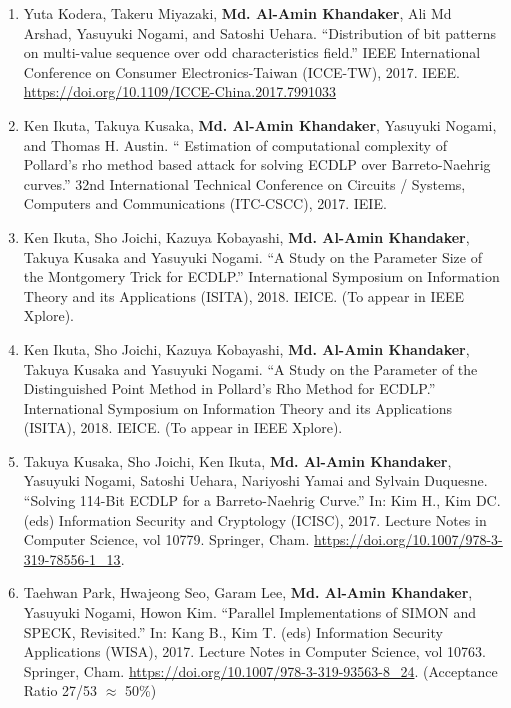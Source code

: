 \begin{itemize}
\begin{enumerate}
	\item Yuta Kodera, Takeru Miyazaki, \textbf{Md. Al-Amin Khandaker}, Ali Md Arshad, Yasuyuki Nogami, and Satoshi Uehara. ``Distribution of bit patterns on multi-value sequence over odd characteristics field.'' IEEE International Conference on Consumer Electronics-Taiwan (ICCE-TW), 2017. IEEE.  \url{https://doi.org/10.1109/ICCE-China.2017.7991033} 
	
	\item Ken Ikuta, Takuya Kusaka, \textbf{Md. Al-Amin Khandaker}, Yasuyuki Nogami, and Thomas H. Austin. `` Estimation of computational complexity of Pollard's rho method based attack for solving ECDLP over Barreto-Naehrig curves.'' 32nd International Technical Conference on Circuits / Systems, Computers and Communications (ITC-CSCC), 2017. IEIE. 
	
	\item Ken Ikuta, Sho Joichi, Kazuya Kobayashi, \textbf{Md. Al-Amin Khandaker}, Takuya Kusaka and Yasuyuki Nogami. ``A Study on the Parameter Size of the Montgomery Trick for ECDLP.'' International Symposium on Information Theory and its Applications (ISITA), 2018. IEICE. (To appear in IEEE Xplore).
	
	\item Ken Ikuta, Sho Joichi, Kazuya Kobayashi, \textbf{Md. Al-Amin Khandaker}, Takuya Kusaka and Yasuyuki Nogami. ``A Study on the Parameter of the Distinguished Point Method in Pollard's Rho Method for ECDLP.'' International Symposium on Information Theory and its Applications (ISITA), 2018. IEICE. (To appear in IEEE Xplore).
	
	\item Takuya Kusaka, Sho Joichi, Ken Ikuta, \textbf{Md. Al-Amin Khandaker}, Yasuyuki Nogami, Satoshi Uehara, Nariyoshi Yamai and Sylvain Duquesne. ``Solving 114-Bit ECDLP for a Barreto-Naehrig Curve.'' In: Kim H., Kim DC. (eds) Information Security and Cryptology (ICISC),  2017. Lecture Notes in Computer Science, vol 10779. Springer, Cham. \url{https://doi.org/10.1007/978-3-319-78556-1_13}.
	
	\item Taehwan Park, Hwajeong Seo, Garam Lee, \textbf{Md. Al-Amin Khandaker}, Yasuyuki Nogami, Howon Kim. ``Parallel Implementations of SIMON and SPECK, Revisited.'' In: Kang B., Kim T. (eds) Information Security Applications (WISA), 2017. Lecture Notes in Computer Science, vol 10763. Springer, Cham. \url{https://doi.org/10.1007/978-3-319-93563-8_24}. (Acceptance Ratio 27/53 $\approx$ 50\%)
	

\end{enumerate}
\end{itemize}
